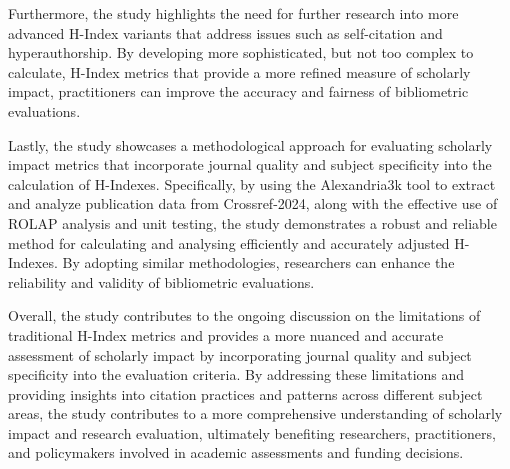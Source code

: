 Furthermore, the study highlights the need for further research into more
advanced H-Index variants that address issues such as self-citation and
hyperauthorship. By developing more sophisticated, but not too complex to
calculate, H-Index metrics that provide a more refined measure of scholarly
impact, practitioners can improve the accuracy and fairness of bibliometric
evaluations.

Lastly, the study showcases a methodological approach for evaluating scholarly
impact metrics that incorporate journal quality and subject specificity into
the calculation of H-Indexes. Specifically, by using the Alexandria3k tool to
extract and analyze publication data from Crossref-2024, along with the
effective use of ROLAP analysis and unit testing, the study demonstrates a
robust and reliable method for calculating and analysing efficiently and
accurately adjusted H-Indexes. By adopting similar methodologies, researchers
can enhance the reliability and validity of bibliometric evaluations.

Overall, the study contributes to the ongoing discussion on the limitations of
traditional H-Index metrics and provides a more nuanced and accurate assessment
of scholarly impact by incorporating journal quality and subject specificity
into the evaluation criteria. By addressing these limitations and providing
insights into citation practices and patterns across different subject areas,
the study contributes to a more comprehensive understanding of scholarly impact
and research evaluation, ultimately benefiting researchers, practitioners, and
policymakers involved in academic assessments and funding decisions. %
